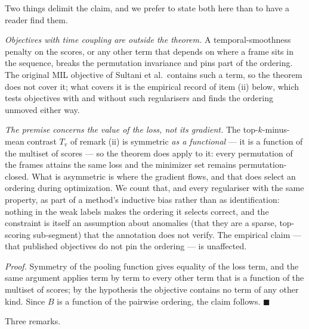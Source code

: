 \documentclass[number,preprint,12pt]{elsarticle}
\begin{document}
Two things delimit the claim, and we prefer to state both here than to have a
reader find them.

\emph{Objectives with time coupling are outside the theorem.} A temporal-smoothness
penalty on the scores, or any other term that depends on where a frame sits in
the sequence, breaks the permutation invariance and pins part of the ordering.
The original MIL objective of Sultani et al.~contains such a term, so the
theorem does not cover it; what covers it is the empirical record of item (ii)
below, which tests objectives with and without such regularisers and finds the
ordering unmoved either way.

\emph{The premise concerns the value of the loss, not its gradient.} The
top-\(k\)-minus-mean contrast \(T_v\) of remark (ii) is symmetric \emph{as a functional}
--- it is a function of the multiset of scores --- so the theorem does apply to
it: every permutation of the frames attains the same loss and the minimizer set
remains permutation-closed. What is asymmetric is where the gradient flows, and
that does select an ordering during optimization. We count that, and every
regulariser with the same property, as part of a method's inductive bias rather
than as identification: nothing in the weak labels makes the ordering it selects
correct, and the constraint is itself an assumption about anomalies (that they
are a sparse, top-scoring sub-segment) that the annotation does not verify. The
empirical claim --- that published objectives do not pin the ordering --- is
unaffected.

\emph{Proof.} Symmetry of the pooling function gives equality of the loss term, and
the same argument applies term by term to every other term that is a function of
the multiset of scores; by the hypothesis the objective contains no term of any
other kind. Since \(B\) is a function of the pairwise ordering, the claim
follows. \(\blacksquare\)

Three remarks.
\end{document}
